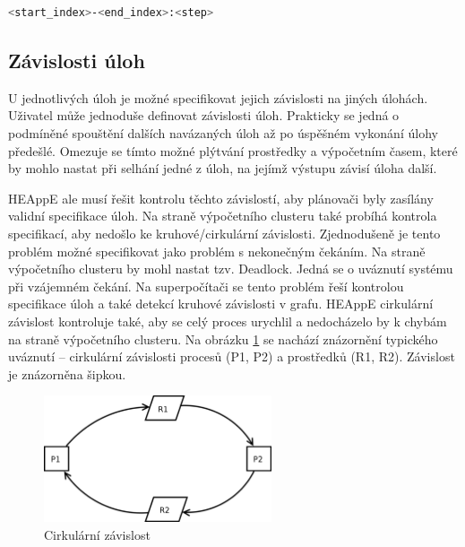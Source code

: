 \begin{lstlisting}[language=bash,caption={Struktura definice JobArrays}]
                            <start_index>-<end_index>:<step>
\end{lstlisting}

\subsection{Závislosti úloh}
U jednotlivých úloh je možné specifikovat jejich závislosti na jiných úlohách. Uživatel může jednoduše definovat závislosti úloh. Prakticky se jedná o podmíněné spouštění dalších navázaných úloh až po úspěšném vykonání úlohy předešlé. Omezuje se tímto možné plýtvání prostředky a výpočetním časem, které by mohlo nastat při selhání jedné z úloh, na jejímž výstupu závisí úloha další.

HEAppE ale musí řešit kontrolu těchto závislostí, aby plánovači byly zasílány validní specifikace úloh. Na straně výpočetního clusteru také probíhá kontrola specifikací, aby nedošlo ke kruhové/cirkulární závislosti. Zjednodušeně je tento problém možné specifikovat jako problém s nekonečným čekáním. Na straně výpočetního clusteru by mohl nastat tzv. Deadlock. Jedná se o uváznutí systému při vzájemném čekání. Na superpočítači se tento problém řeší kontrolou specifikace úloh a také detekcí kruhové závislosti v grafu. HEAppE cirkulární závislost kontroluje také, aby se celý proces urychlil a nedocházelo by k chybám na straně výpočetního clusteru. Na obrázku \ref{fig:cirkularni-zavislost} se nachází znázornění typického uváznutí – cirkulární závislosti procesů (P1, P2) a prostředků (R1, R2). Závislost je znázorněna šipkou.


\begin{figure}[!h]
	\centering
	\includegraphics[width=0.6\textwidth]{Figures/Process_deadlock.png}
	\caption{Cirkulární závislost \cite{OvBwjLleECKerU0E}}
	\label{fig:cirkularni-zavislost}
\end{figure}

\newpage
